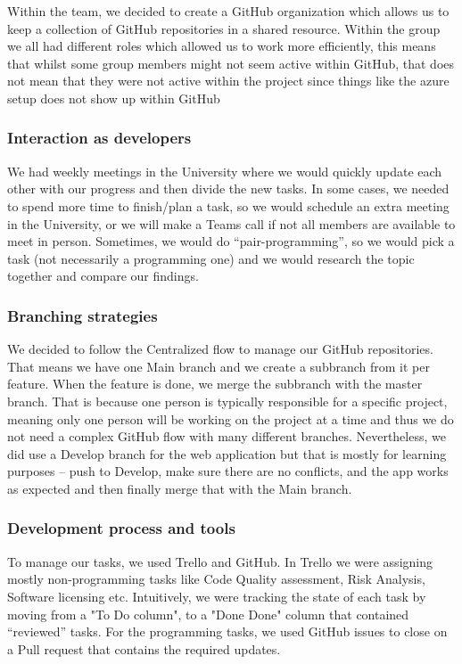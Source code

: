      Within the team, we decided to create a GitHub organization which allows us to keep a collection of GitHub repositories in a shared resource. Within the group we all had different roles which allowed us to work more efficiently, this means that whilst some group members might not seem active within GitHub, that does not mean that they were not active within the project since things like the azure setup does not show up within GitHub
     
     \subsubsection{Interaction as developers}
     We had weekly meetings in the University where we would quickly update each other with our progress and then divide the new tasks. In some cases, we needed to spend more time to finish/plan a task, so we would schedule an extra meeting in the University, or we will make a Teams call if not all members are available to meet in person. Sometimes, we would do “pair-programming”, so we would pick a task (not necessarily a programming one) and we would research the topic together and compare our findings. 
     
    \subsubsection{Branching strategies}
    We decided to follow the Centralized flow to manage our GitHub repositories. That means we have one Main branch and we create a subbranch from it per feature. When the feature is done, we merge the subbranch with the master branch. That is because one person is typically responsible for a specific project, meaning only one person will be working on the project at a time and thus we do not need a complex GitHub flow with many different branches. Nevertheless, we did use a Develop branch for the web application but that is mostly for learning purposes – push to Develop, make sure there are no conflicts, and the app works as expected and then finally merge that with the Main branch.
    \newpage
    \subsubsection{Development process and tools}
    To manage our tasks, we used Trello and GitHub. In Trello we were assigning mostly non-programming tasks like Code Quality assessment, Risk Analysis, Software licensing etc. Intuitively, we were tracking the state of each task by moving from a "To Do column", to a "Done Done" column that contained “reviewed” tasks. For the programming tasks, we used GitHub issues to close on a Pull request that contains the required updates. 
     
     